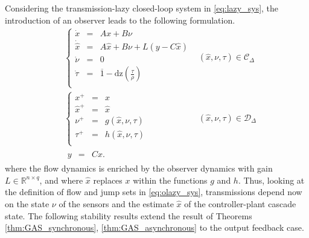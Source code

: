 \documentclass[twocolumn]{autart}
\newcommand\real{\ensuremath{{\mathbb R}}}
\newcommand\dz{\mathrm{dz}}
\begin{document}
Considering the transmission-lazy closed-loop system in \eqref{eq:lazy_sys},
the introduction of an observer leads to the following formulation.
\begin{subequations}
\label{eq:olazy_sys}
\begin{align}
&	\left\{ \begin{array}{lll}
		\dot{x} &=& Ax + B \nu  \\
		\dot{\hat{x}} &=& A\hat{x} + B\nu + L(y-C\hat{x}) \\
		\dot{\nu} &=& 0 \\
		\dot{\tau} &=& \overline{1}-\dz(\frac{\tau}{\rho} ) \\
	 \end{array}\right. & 
	(\hat{x},\nu,\tau)\in \mathcal{C}_\Delta \\
&	\left\{\begin{array}{lll}
		x^+ &=& x  \\
		\hat{x}^+ &=& \hat{x} \\
		\nu^+ &=& g(\hat{x},\nu,\tau) \\
		\tau^+ &=& h(\hat{x},\nu,\tau) \\
	\end{array} \right. & 
        (\hat{x},\nu,\tau)\in \mathcal{D}_\Delta \\
&	 \begin{array}{lll}
		y &=& Cx.  
	 \end{array} 
\end{align}
\end{subequations}
where the flow dynamics is enriched by the observer dynamics
with gain $L\in\real^{n\times q}$,
and where $\hat{x}$ replaces $x$ within the functions $g$ and $h$.
Thus, looking at the definition of flow and jump sets in \eqref{eq:olazy_sys},
transmissions depend now on the state $\nu$ of the sensors and the 
estimate $\hat{x}$ of the controller-plant cascade state. 
The following stability results extend the result of Theorems 
\ref{thm:GAS_synchronous}, \ref{thm:GAS_asynchronous} 
to the output feedback case.
\end{document}
